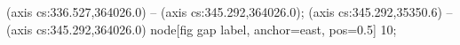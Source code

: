  (axis cs:336.527,364026.0) -- (axis cs:345.292,364026.0);
 (axis cs:345.292,35350.6) -- (axis cs:345.292,364026.0)
  node[fig gap label, anchor=east, pos=0.5] {\texttimes{}10};
